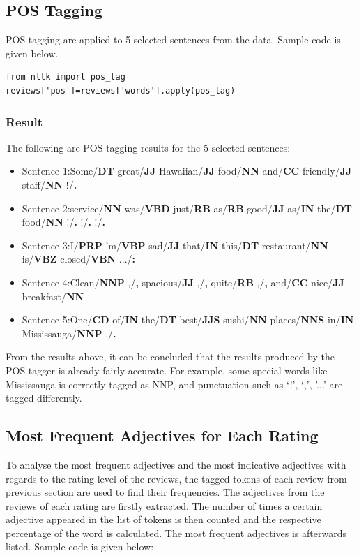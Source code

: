 \documentclass[sigconf]{acmart}
\begin{document}
\subsection{POS Tagging}
POS tagging are applied to 5 selected sentences from the data. Sample code is given below.
\begin{verbatim}
from nltk import pos_tag
reviews['pos']=reviews['words'].apply(pos_tag)
\end{verbatim}

\subsubsection{Result} The following are POS tagging results for the 5 selected sentences:
\begin{itemize}
\item{Sentence 1}:Some/\textbf{DT} great/\textbf{JJ} Hawaiian/\textbf{JJ} food/\textbf{NN} and/\textbf{CC} friendly/\textbf{JJ} staff/\textbf{NN} !/\textbf{.}
\item{Sentence 2}:service/\textbf{NN} was/\textbf{VBD} just/\textbf{RB}  as/\textbf{RB} good/\textbf{JJ} as/\textbf{IN} the/\textbf{DT} food/\textbf{NN} !/\textbf{.} !/\textbf{.} !/\textbf{.}
\item{Sentence 3}:I/\textbf{PRP} 'm/\textbf{VBP} sad/\textbf{JJ}  that/\textbf{IN} this/\textbf{DT} restaurant/\textbf{NN} is/\textbf{VBZ} closed/\textbf{VBN} .../\textbf{:}
\item{Sentence 4}:Clean/\textbf{NNP} ,/\textbf{,} spacious/\textbf{JJ} ,/\textbf{,} quite/\textbf{RB} ,/\textbf{,} and/\textbf{CC} nice/\textbf{JJ} breakfast/\textbf{NN}
\item{Sentence 5}:One/\textbf{CD} of/\textbf{IN} the/\textbf{DT} best/\textbf{JJS} sushi/\textbf{NN} places/\textbf{NNS} in/\textbf{IN} Mississauga/\textbf{NNP} ./\textbf{.}
\end{itemize}

From the results above, it can be concluded that the results produced by the POS tagger is already fairly accurate. For example, some special words like Mississauga is correctly tagged as NNP, and punctuation such as ‘!', ‘,’, '...' are tagged differently.

\subsection{Most Frequent Adjectives for Each Rating}
To analyse the most frequent adjectives and the most indicative adjectives with regards to the rating level of the reviews, the tagged tokens of each review from previous section are used to find their frequencies. The adjectives from the reviews of each rating are firstly extracted. The number of times a certain adjective appeared in the list of tokens is then counted and the respective percentage of the word is calculated. The most frequent adjectives is afterwards listed. Sample code is given below:
\end{document}
